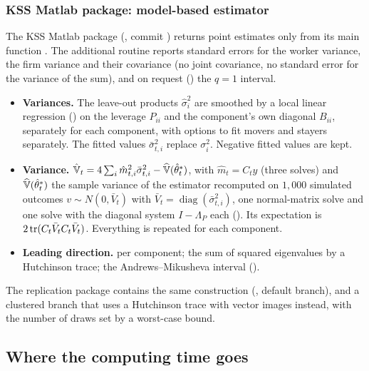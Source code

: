 \subsubsection{KSS Matlab package: model-based estimator}\label{kss:sec:kssm}

The KSS Matlab package (, commit ) returns point estimates only from
its main function . The additional routine  reports
standard errors for the worker variance, the firm variance and their covariance (no joint covariance,
no standard error for the variance of the sum), and on request () the $q=1$
interval.
\begin{itemize}
\item \textbf{Variances.} The leave-out products $\hat\sigma_i^2$ are smoothed by a local linear
regression () on the leverage $P_{ii}$ and the component's own diagonal $B_{ii}$,
separately for each component, with options to fit movers and stayers separately. The fitted values
$\bar\sigma_{t,i}^2$ replace $\sigma_i^2$. Negative fitted values are kept.
\item \textbf{Variance.} $\hat{\mathbb{V}}_t=4\sum_i\hat m_{t,i}^2\bar\sigma_{t,i}^2-\widehat{\mathbb{V}}(\hat\theta^*_t)$, with
$\hat m_t=C_ty$ (three solves) and $\widehat{\mathbb{V}}(\hat\theta^*_t)$ the sample variance of the estimator
recomputed on $1{,}000$ simulated outcomes $v\sim N(0,\bar V_t)$ with $\bar V_t=\operatorname{diag}(\bar\sigma_{t,i}^2)$, one
normal-matrix solve and one solve with the diagonal system $I-\Lambda_P$ each
(). Its expectation is
$2\operatorname{tr}(C_t\bar V_tC_t\bar V_t)$. Everything is repeated for each component.
\item \textbf{Leading direction.}  per component; the sum of squared
eigenvalues by a Hutchinson trace; the Andrews--Mikusheva interval ().
\end{itemize}
The replication package contains the same construction (, default branch),
and a clustered branch that uses a Hutchinson trace with vector images instead, with the number of draws
set by a worst-case bound.

\subsection{Where the computing time goes}\label{kss:sec:cost}


